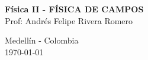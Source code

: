 

\thispagestyle{empty}


\begin{center}

\vspace*{0.1cm} 

\vspace*{3.5cm} {\bf{\Large{F\'isica II - FÍSICA DE CAMPOS}}}%
\\
\vspace{3.5cm} 
 Prof: Andr\'es Felipe Rivera Romero\\
\vspace{2.0cm}

 \vspace{3.0cm}
 \vspace{3.cm}
 \vspace{1.6cm}
 Medellín - Colombia \\
 \today
\end{center}

